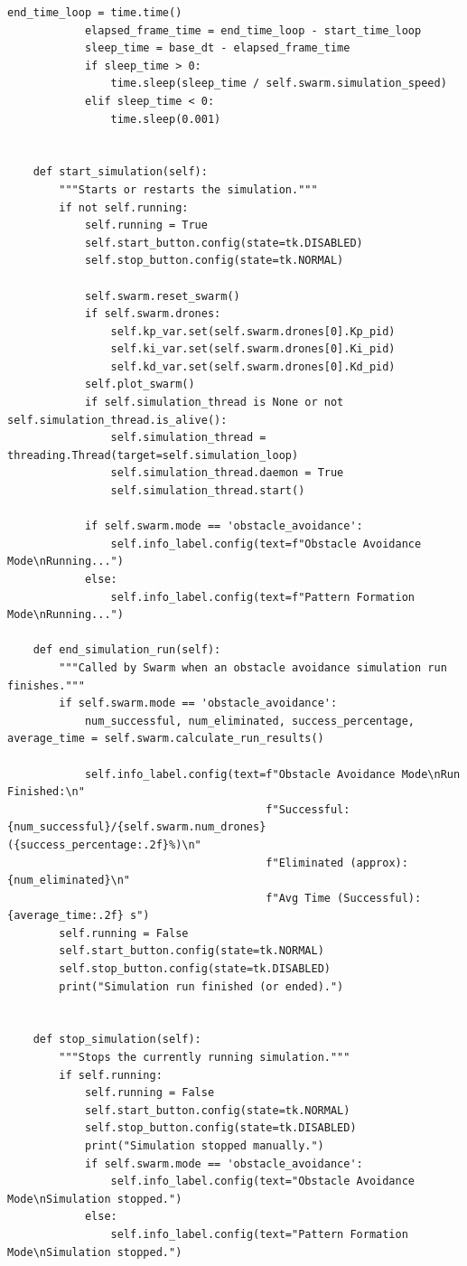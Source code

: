 \documentclass[11pt]{article}
\begin{document}
\begin{lstlisting}[style=pythonstyle]
            end_time_loop = time.time()
            elapsed_frame_time = end_time_loop - start_time_loop
            sleep_time = base_dt - elapsed_frame_time
            if sleep_time > 0:
                time.sleep(sleep_time / self.swarm.simulation_speed)
            elif sleep_time < 0:
                time.sleep(0.001)


    def start_simulation(self):
        """Starts or restarts the simulation."""
        if not self.running:
            self.running = True
            self.start_button.config(state=tk.DISABLED)
            self.stop_button.config(state=tk.NORMAL)

            self.swarm.reset_swarm()
            if self.swarm.drones:
                self.kp_var.set(self.swarm.drones[0].Kp_pid)
                self.ki_var.set(self.swarm.drones[0].Ki_pid)
                self.kd_var.set(self.swarm.drones[0].Kd_pid)
            self.plot_swarm()
            if self.simulation_thread is None or not self.simulation_thread.is_alive():
                self.simulation_thread = threading.Thread(target=self.simulation_loop)
                self.simulation_thread.daemon = True
                self.simulation_thread.start()

            if self.swarm.mode == 'obstacle_avoidance':
                self.info_label.config(text=f"Obstacle Avoidance Mode\nRunning...")
            else:
                self.info_label.config(text=f"Pattern Formation Mode\nRunning...")

    def end_simulation_run(self):
        """Called by Swarm when an obstacle avoidance simulation run finishes."""
        if self.swarm.mode == 'obstacle_avoidance':
            num_successful, num_eliminated, success_percentage, average_time = self.swarm.calculate_run_results()

            self.info_label.config(text=f"Obstacle Avoidance Mode\nRun Finished:\n"
                                        f"Successful: {num_successful}/{self.swarm.num_drones} ({success_percentage:.2f}%)\n"
                                        f"Eliminated (approx): {num_eliminated}\n"
                                        f"Avg Time (Successful): {average_time:.2f} s")
        self.running = False
        self.start_button.config(state=tk.NORMAL)
        self.stop_button.config(state=tk.DISABLED)
        print("Simulation run finished (or ended).")


    def stop_simulation(self):
        """Stops the currently running simulation."""
        if self.running:
            self.running = False
            self.start_button.config(state=tk.NORMAL)
            self.stop_button.config(state=tk.DISABLED)
            print("Simulation stopped manually.")
            if self.swarm.mode == 'obstacle_avoidance':
                self.info_label.config(text="Obstacle Avoidance Mode\nSimulation stopped.")
            else:
                self.info_label.config(text="Pattern Formation Mode\nSimulation stopped.")


\end{lstlisting}
\end{document}
